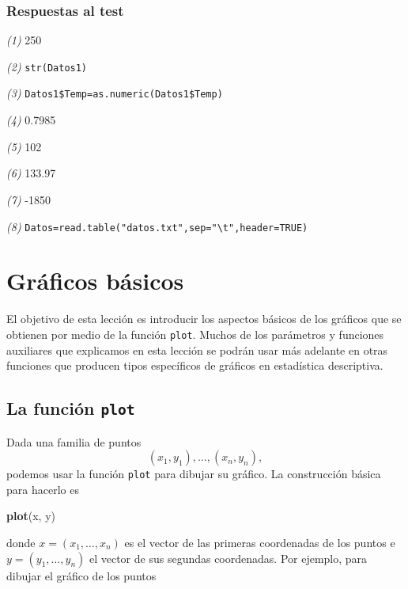 \documentclass[]{book}
\newenvironment{Shaded}{\begin{snugshade}}{\end{snugshade}}
\newcommand{\KeywordTok}[1]{\textcolor[rgb]{0.13,0.29,0.53}{\textbf{#1}}}
\newcommand{\NormalTok}[1]{#1}
\theoremstyle{definition}
\theoremstyle{definition}
\theoremstyle{definition}
\theoremstyle{remark}
\begin{document}
\hypertarget{respuestas-al-test-3}{%
\subsection*{Respuestas al test}\label{respuestas-al-test-3}}

\emph{(1)} 250

\emph{(2)} \texttt{str(Datos1)}

\emph{(3)} \texttt{Datos1\$Temp=as.numeric(Datos1\$Temp)}

\emph{(4)} 0.7985

\emph{(5)} 102

\emph{(6)} 133.97

\emph{(7)} -1850

\emph{(8)} \texttt{Datos=read.table("datos.txt",sep="\textbackslash{}t",header=TRUE)}

\hypertarget{chap:plot}{%
\chapter{Gráficos básicos}\label{chap:plot}}

El objetivo de esta lección es introducir los aspectos básicos de los gráficos que se obtienen por medio de la función \texttt{plot}. Muchos de los parámetros y funciones auxiliares que explicamos en esta lección se podrán usar más adelante en otras funciones que producen tipos específicos de gráficos en estadística descriptiva.

\hypertarget{la-funcion-plot}{%
\section{\texorpdfstring{La función \texttt{plot}}{La función plot}}\label{la-funcion-plot}}

Dada una familia de puntos
\[
(x_1, y_1), \ldots, (x_n, y_n), 
\]
podemos usar la función \texttt{plot} para dibujar su gráfico. La construcción básica para hacerlo es

\begin{Shaded}
\begin{Highlighting}[]
\KeywordTok{plot}\NormalTok{(x, y)}
\end{Highlighting}
\end{Shaded}

donde \(x=(x_1, \ldots, x_n)\) es el vector de las primeras coordenadas de los puntos e \(y=(y_1, \ldots, y_n)\) el vector de sus segundas coordenadas. Por ejemplo, para dibujar el gráfico de los puntos
\end{document}
